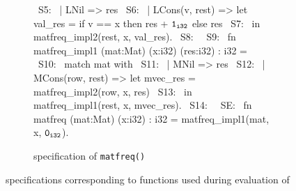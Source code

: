 \begin{figure}[H]
\begin{subfigure}[b]{\textwidth}
\begin{center}
\begin{allLangEnvFoot}
~{\tiny \textcolor{mygray}{S5:\phantom{ }}}~   | LNil => res
~{\tiny \textcolor{mygray}{S6:\phantom{ }}}~   | LCons(v, rest) => let val_res = if v == x then res + ${\tt 1_{i32}}$ else res
~{\tiny \textcolor{mygray}{S7:\phantom{ }}}~                       in matfreq_impl2(rest, x, val_res).
~{\tiny \textcolor{mygray}{S8:\phantom{ }}}~ 
~{\tiny \textcolor{mygray}{S9:\phantom{ }}}~ fn matfreq_impl1 (mat:Mat) (x:i32) (res:i32) : i32 =
~{\tiny \textcolor{mygray}{S10:}}~   match mat with
~{\tiny \textcolor{mygray}{S11:}}~   | MNil => res
~{\tiny \textcolor{mygray}{S12:}}~   | MCons(row, rest) => let mvec_res = matfreq_impl2(row, x, res)
~{\tiny \textcolor{mygray}{S13:}}~                         in matfreq_impl1(rest, x, mvec_res).
~{\tiny \textcolor{mygray}{S14:}}~ 
~{\tiny \textcolor{mygray}{SE:\phantom{ }}}~ fn matfreq (mat:Mat) (x:i32) : i32 = matfreq_impl1(mat, x, ${\tt 0_{i32}}$).
\end{allLangEnvFoot}
\end{center}
\caption{\SpecL{} specification of {\tt matfreq()}}
\end{subfigure}
\caption{\label{fig:specifications}\SpecL{} specifications corresponding to functions used during evaluation of \toolName{}}
\end{figure}